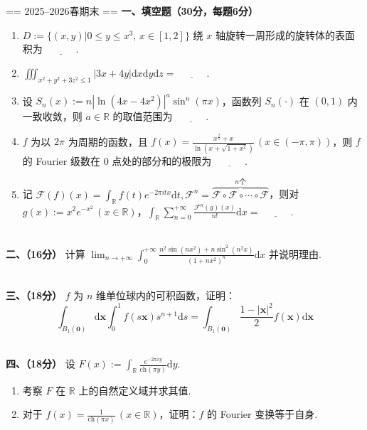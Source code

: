 \newcommand{\x}{\mathbf{x}}\newcommand{\y}{\mathbf{y}}
\newcommand{\U}{\mathbf{u}}\newcommand{\F}{\mathscr{F}}

== 2025--2026春期末 ==
\textbf{一、填空题（30分，每题6分）}

\begin{enumerate}[label=(\arabic*)]
    \item $D:=\{(x,y)|0\leq y\leq x^3,\,x\in[1,2]\}$ 绕 $x$ 轴旋转一周形成的旋转体的表面积为 $\underline{\qquad\quad}$.
    \item $\displaystyle\iiint_{x^2+y^2+3z^2\leq1}|3x+4y|\mathrm dx\mathrm dy\mathrm dz=\underline{\qquad\quad}$.
    \item 设 $S_n(x):=n|\ln(4x-4x^2)|^a\sin^n(\pi x)$，函数列 $S_n(\cdot)$ 在 $(0,1)$ 内一致收敛，则 $a\in\mathbb R$ 的取值范围为 $\underline{\qquad\quad}$.
    \item $f$ 为以 $2\pi$ 为周期的函数，且 $\displaystyle f(x)=\frac{x^{\frac25}+x}{\ln(x+\sqrt{1+x^2})}\,(x\in(-\pi,\pi))$，则 $f$ 的 Fourier 级数在 $0$ 点处的部分和的极限为 $\underline{\qquad\quad}$.
    \item 记 $\displaystyle\mathscr F(f)(x)=\int_{\mathbb R}f(t)e^{-2\pi itx}\mathrm dt, \mathscr F^n=\overbrace{\mathscr F\circ\mathscr F\circ\cdots\circ\mathscr F}^{n个}$，则对 $g(x):=x^2e^{-x^2}\,(x\in\mathbb R)$，$\displaystyle\int_{\mathbb R}\sum_{n=0}^{+\infty}\frac{\mathscr F^n(g)(x)}{n!}\mathrm dx=\underline{\quad\qquad}$.
\end{enumerate}

\\

\textbf{二、（16分）}
计算 $\displaystyle\lim_{n\to+\infty}\int_0^{+\infty}\frac{n^2\sin(nx^2)+n\sin^2(n^2x)}{(1+nx^2)^n}\mathrm dx$ 并说明理由.

\\

\textbf{三、（18分）}
$f$ 为 $n$ 维单位球内的可积函数，证明：
$$\displaystyle\int_{B_1(\mathbf 0)}\mathrm d\mathbf x\int_0^1f(s\mathbf x)s^{n+1}\mathrm ds=\int_{B_1(\mathbf 0)}\frac{1-|\mathbf x|^2}2f(\mathbf x)\mathrm d\mathbf x$$

\\

\textbf{四、（18分）}
设 $\displaystyle F(x):=\int_{\mathbb R}\frac{e^{-2\pi xy}}{\mathrm{ch}(\pi y)}\mathrm dy$.
\begin{enumerate}
    \item 考察 $F$ 在 $\mathbb R$ 上的自然定义域并求其值.
    \item 对于 $\displaystyle f(x)=\frac1{\mathrm{ch}(\pi x)}\,(x\in\mathbb R)$，证明：$f$ 的 Fourier 变换等于自身.
\end{enumerate}

